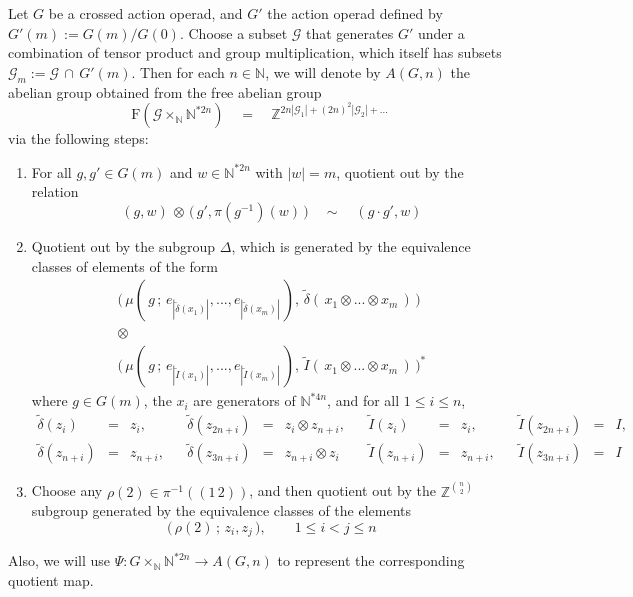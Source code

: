 \documentclass{amsbook} %
\numberwithin{section}{chapter}
\begin{document}
\begin{Defi} \label{AGndef} Let $G$ be a crossed action operad, and $G'$ the action operad defined by $G'(m) := G(m)/G(0)$. Choose a subset $\mathcal{G}$ that generates $G'$ under a combination of tensor product and group multiplication, which itself has subsets $\mathcal{G}_m := \mathcal{G} \, \cap \, G'(m)$. Then for each $n \in \mathbb{N}$, we will denote by $A(G,n)$ the abelian group obtained from the free abelian group 
\[ \mathrm{F}( \mathcal{G} \times_{\mathbb{N}} \mathbb{N}^{\ast 2n}) \quad = \quad \mathbb{Z}^{2n|\mathcal{G}_1| + (2n)^2|\mathcal{G}_2| + ...} \]
via the following steps:
\begin{enumerate}%
\item For all $g, g' \in G(m)$ and $w \in \mathbb{N}^{\ast 2n}$ with $|w| = m$, quotient out by the relation 
\[ (g, w) \, \otimes \, \big( \, g', \pi(g^{-1})(w) \, \big) \quad \sim \quad (g \cdot g', w) \]
\item Quotient out by the subgroup $\Delta$, which is generated by the equivalence classes of elements of the form
\[ \begin{array}{c}
				\big( \, \mu( \, g \, ; \, e_{|\tilde{\delta}(x_1)|}, ..., e_{|\tilde{\delta}(x_m)|} \, ), \, \tilde{\delta}( \, x_1 \otimes ... \otimes x_m \, ) \, \big) \\
				\otimes \\
				\big( \, \mu( \, g \, ; \, e_{|\tilde{I}(x_1)|}, ..., e_{|\tilde{I}(x_m)|} \, ), \, \tilde{I}( \, x_1 \otimes ... \otimes x_m \, ) \, \big)^*
		\end{array} 
\]
where $g \in G(m)$, the $x_i$ are generators of $\mathbb{N}^{\ast 4n}$, and for all $1 \le i \le n$,
\[ \begin{array}{rclcrclcrclcrcl}
			\tilde{\delta}(z_i) & = & z_i, & & \tilde{\delta}(z_{2n+i}) & = & z_i \otimes z_{n+i}, & & \tilde{I}(z_i) & = & z_i, & &\tilde{I}(z_{2n+i}) & = & I,\\
			\tilde{\delta}(z_{n+i}) & = & z_{n+i}, &  & \tilde{\delta}(z_{3n+i}) & = & z_{n+i} \otimes z_i & & \tilde{I}(z_{n+i}) & = & z_{n+i}, & & \tilde{I}(z_{3n+i}) & = & I
			 \end{array}
\] 
\item Choose any $\rho(2) \in \pi^{-1}((1 \, 2))$, and then quotient out by the $\mathbb{Z}^{{n}\choose{2}}$ subgroup generated by the equivalence classes of the elements 
\[ \big( \, \rho(2) \, ; \, z_i, z_j \, \big), \quad \quad 1 \le i < j \le n \]
\end{enumerate}
Also, we will use $\Psi: G \times_{\mathbb{N}} \mathbb{N}^{\ast 2n} \to A(G,n)$ to represent the corresponding quotient map. 
\end{Defi}
\end{document}

